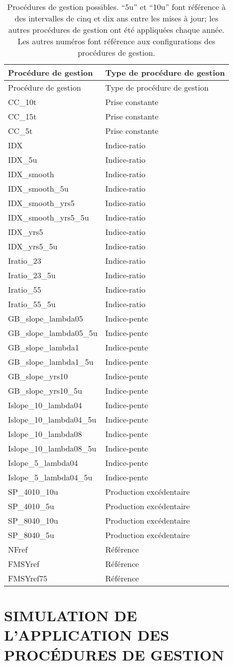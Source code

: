 \documentclass[french,11pt]{book}
\begin{document}
\clearpage
\begin{longtable}[]{@{}ll@{}}
\caption{\label{tab:mps}Procédures de gestion possibles. ``5u'' et ``10u'' font référence à des intervalles de cinq et dix ans entre les mises à jour; les autres procédures de gestion ont été appliquées chaque année. Les autres numéros font référence aux configurations des procédures de gestion.}\tabularnewline
\toprule
Procédure de gestion & Type de procédure de gestion\tabularnewline
\midrule
\endfirsthead
\toprule
Procédure de gestion & Type de procédure de gestion\tabularnewline
\midrule
\endhead
CC\_10t & Prise constante\tabularnewline
CC\_15t & Prise constante\tabularnewline
CC\_5t & Prise constante\tabularnewline
IDX & Indice-ratio\tabularnewline
IDX\_5u & Indice-ratio\tabularnewline
IDX\_smooth & Indice-ratio\tabularnewline
IDX\_smooth\_5u & Indice-ratio\tabularnewline
IDX\_smooth\_yrs5 & Indice-ratio\tabularnewline
IDX\_smooth\_yrs5\_5u & Indice-ratio\tabularnewline
IDX\_yrs5 & Indice-ratio\tabularnewline
IDX\_yrs5\_5u & Indice-ratio\tabularnewline
Iratio\_23 & Indice-ratio\tabularnewline
Iratio\_23\_5u & Indice-ratio\tabularnewline
Iratio\_55 & Indice-ratio\tabularnewline
Iratio\_55\_5u & Indice-ratio\tabularnewline
GB\_slope\_lambda05 & Indice-pente\tabularnewline
GB\_slope\_lambda05\_5u & Indice-pente\tabularnewline
GB\_slope\_lambda1 & Indice-pente\tabularnewline
GB\_slope\_lambda1\_5u & Indice-pente\tabularnewline
GB\_slope\_yrs10 & Indice-pente\tabularnewline
GB\_slope\_yrs10\_5u & Indice-pente\tabularnewline
Islope\_10\_lambda04 & Indice-pente\tabularnewline
Islope\_10\_lambda04\_5u & Indice-pente\tabularnewline
Islope\_10\_lambda08 & Indice-pente\tabularnewline
Islope\_10\_lambda08\_5u & Indice-pente\tabularnewline
Islope\_5\_lambda04 & Indice-pente\tabularnewline
Islope\_5\_lambda04\_5u & Indice-pente\tabularnewline
SP\_4010\_10u & Production excédentaire\tabularnewline
SP\_4010\_5u & Production excédentaire\tabularnewline
SP\_8040\_10u & Production excédentaire\tabularnewline
SP\_8040\_5u & Production excédentaire\tabularnewline
NFref & Référence\tabularnewline
FMSYref & Référence\tabularnewline
FMSYref75 & Référence\tabularnewline
\bottomrule
\end{longtable}
\clearpage

\hypertarget{sec:simulation}{%
\section{SIMULATION DE L'APPLICATION DES PROCÉDURES DE GESTION}\label{sec:simulation}}
\end{document}
